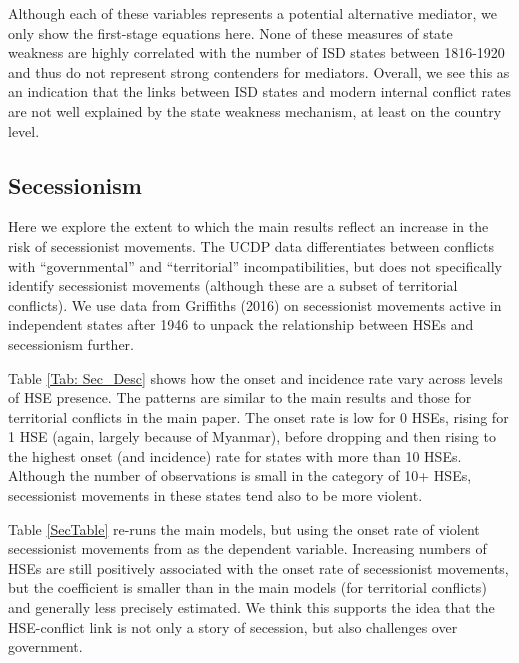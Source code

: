 \documentclass[12pt]{article}
\begin{document}
Although each of these variables represents a potential alternative mediator, we only show the first-stage equations here. None of these measures of state weakness are highly correlated with the number of ISD states between 1816-1920 and thus do not represent strong contenders for mediators. Overall, we see this as an indication that the links between ISD states and modern internal conflict rates are not well explained by the state weakness mechanism, at least on the country level. 

 \clearpage     


    
 \clearpage     

\subsection{Secessionism}

Here we explore the extent to which the main results reflect an increase in the risk of secessionist movements. The UCDP data differentiates between conflicts with ``governmental'' and ``territorial'' incompatibilities, but does not specifically identify secessionist movements (although these are a subset of territorial conflicts). We use data from Griffiths (2016) on secessionist movements active in independent states after 1946 to unpack the relationship between HSEs and secessionism further.  


    

Table \ref{Tab: Sec_Desc} shows how the onset and incidence rate vary across levels of HSE presence. The patterns are similar to the main results and those for territorial conflicts in the main paper. The onset rate is low for 0 HSEs, rising for 1 HSE (again, largely because of Myanmar), before dropping and then rising to the highest onset (and incidence) rate for states with more than 10 HSEs. Although the number of observations is small in the category of 10+ HSEs, secessionist movements in these states tend also to be more violent. 

 
Table \ref{SecTable} re-runs the main models, but using the onset rate of violent secessionist movements from \cite{Griffiths2016} as the dependent variable. Increasing numbers of HSEs are still positively associated with the onset rate of secessionist movements, but the coefficient is smaller than in the main models (for territorial conflicts) and generally less precisely estimated. We think this supports the idea that the HSE-conflict link is not only a story of secession, but also challenges over government. 
    
\end{document}
